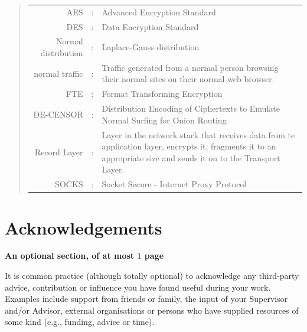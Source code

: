 \documentclass[ %
                    author={Samuel Russell},
                supervisor={Prof. Bogdan Warinschi},
                    degree={MEng},
                     title={Innocuous Ciphertexts},
                  subtitle={The DE-CENSOR Scheme},
                      type={research},
                      year={2018} ]{dissertation}
\begin{document}
\begin{quote}
\noindent
\begin{tabularx}{\textwidth}{ r c X }
AES                 &:		& Advanced Encryption Standard                                         \\
DES                 &:		& Data Encryption Standard                                             \\
Normal distribution &:		& Laplace-Gauss distribution
\\
normal traffic		&:		& Traffic generated from a normal person
browsing their normal sites on their normal web browser.\\
FTE					&:		& Format Transforming Encryption\\
DE-CENSOR			&:		& Distribution Encoding of Ciphertexts to Emulate Normal Surfing for Onion Routing\\
Record Layer		&:		& Layer in the network stack that receives data from te application layer, encrypts it, fragments it to an appropriate size and sends it on to the Transport Layer.\\
SOCKS				&:		& Socket Secure - Internet Proxy Protocol

\end{tabularx}
\end{quote}


\chapter*{Acknowledgements}

{\bf An optional section, of at most $1$ page}
\vspace{1cm} 

\noindent
It is common practice (although totally optional) to acknowledge any
third-party advice, contribution or influence you have found useful
during your work.  Examples include support from friends or family, 
the input of your Supervisor and/or Advisor, external organisations 
or persons who  have supplied resources of some kind (e.g., funding, 
advice or time).

%
\end{document}
